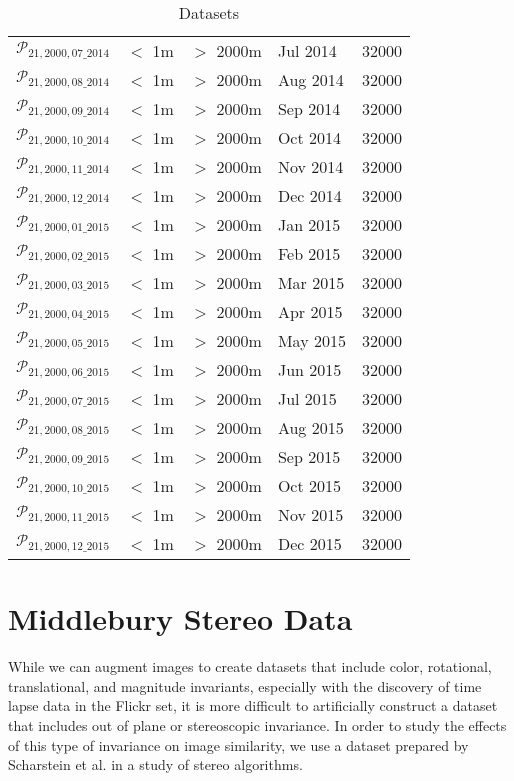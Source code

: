 \begin{table}
\begin{tabular}{c >{\centering\arraybackslash}m{3.2cm} >{\centering\arraybackslash}m{3cm} >{\centering\arraybackslash}m{2cm} c}
		$\mathcal{P}_{21,2000,07\_2014}$ & $<$ 1m & $>$ 2000m & Jul 2014  & 32000\\
		$\mathcal{P}_{21,2000,08\_2014}$ & $<$ 1m & $>$ 2000m & Aug 2014  & 32000\\
		$\mathcal{P}_{21,2000,09\_2014}$ & $<$ 1m & $>$ 2000m & Sep 2014  & 32000\\
		$\mathcal{P}_{21,2000,10\_2014}$ & $<$ 1m & $>$ 2000m & Oct 2014  & 32000\\
		$\mathcal{P}_{21,2000,11\_2014}$ & $<$ 1m & $>$ 2000m & Nov 2014  & 32000\\
		$\mathcal{P}_{21,2000,12\_2014}$ & $<$ 1m & $>$ 2000m & Dec 2014  & 32000\\
		$\mathcal{P}_{21,2000,01\_2015}$ & $<$ 1m & $>$ 2000m & Jan 2015  & 32000\\
		$\mathcal{P}_{21,2000,02\_2015}$ & $<$ 1m & $>$ 2000m & Feb 2015  & 32000\\
		$\mathcal{P}_{21,2000,03\_2015}$ & $<$ 1m & $>$ 2000m & Mar 2015  & 32000\\
		$\mathcal{P}_{21,2000,04\_2015}$ & $<$ 1m & $>$ 2000m & Apr 2015  & 32000\\
		$\mathcal{P}_{21,2000,05\_2015}$ & $<$ 1m & $>$ 2000m & May 2015  & 32000\\
		$\mathcal{P}_{21,2000,06\_2015}$ & $<$ 1m & $>$ 2000m & Jun 2015  & 32000\\
		$\mathcal{P}_{21,2000,07\_2015}$ & $<$ 1m & $>$ 2000m & Jul 2015  & 32000\\
		$\mathcal{P}_{21,2000,08\_2015}$ & $<$ 1m & $>$ 2000m & Aug 2015  & 32000\\
		$\mathcal{P}_{21,2000,09\_2015}$ & $<$ 1m & $>$ 2000m & Sep 2015  & 32000\\
		$\mathcal{P}_{21,2000,10\_2015}$ & $<$ 1m & $>$ 2000m & Oct 2015  & 32000\\
		$\mathcal{P}_{21,2000,11\_2015}$ & $<$ 1m & $>$ 2000m & Nov 2015  & 32000\\
		$\mathcal{P}_{21,2000,12\_2015}$ & $<$ 1m & $>$ 2000m & Dec 2015  & 32000\\
		\bottomrule
	\end{tabular}
	\caption{Datasets}
	\label{table:datasets}
\end{table}


\section{Middlebury Stereo Data}
While we can augment images to create datasets that include color, rotational, translational, and magnitude invariants, especially with the discovery of time lapse data in the Flickr set, it is more difficult to artificially construct a dataset that includes out of plane or stereoscopic invariance. In order to study the effects of this type of invariance on image similarity, we use a dataset prepared by Scharstein et al. in a study of stereo algorithms.\cite{scharstein2014high}

